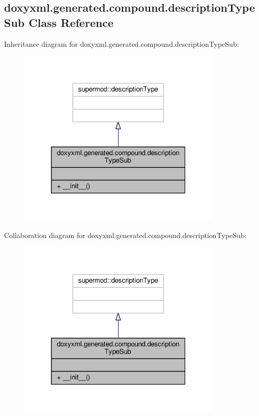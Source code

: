 \subsection{doxyxml.\+generated.\+compound.\+description\+Type\+Sub Class Reference}
\label{classdoxyxml_1_1generated_1_1compound_1_1descriptionTypeSub}


Inheritance diagram for doxyxml.\+generated.\+compound.\+description\+Type\+Sub\+:
\nopagebreak
\begin{figure}[H]
\begin{center}
\leavevmode
\includegraphics[width=277pt]{d7/d49/classdoxyxml_1_1generated_1_1compound_1_1descriptionTypeSub__inherit__graph}
\end{center}
\end{figure}


Collaboration diagram for doxyxml.\+generated.\+compound.\+description\+Type\+Sub\+:
\nopagebreak
\begin{figure}[H]
\begin{center}
\leavevmode
\includegraphics[width=277pt]{de/d3e/classdoxyxml_1_1generated_1_1compound_1_1descriptionTypeSub__coll__graph}
\end{center}
\end{figure}
